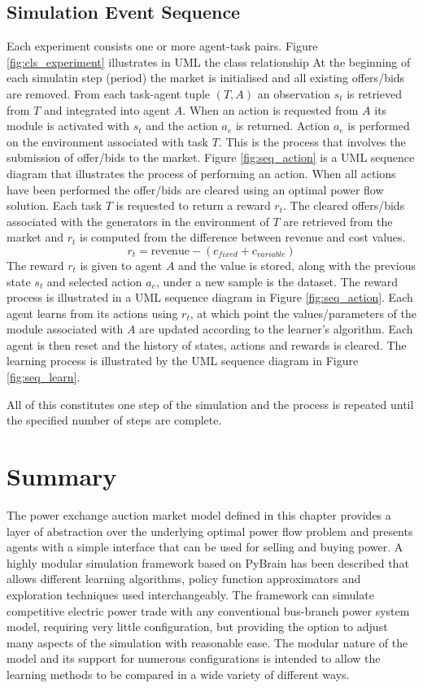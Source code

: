\subsection{Simulation Event Sequence}
%
Each experiment consists one or more agent-task pairs.  Figure
\ref{fig:cls_experiment} illustrates in UML the class relationship
%
At the beginning of each simulatin step (period) the market is initialised and
all existing offers/bids are removed.  From each task-agent tuple $(T,A)$ an
observation $s_t$ is retrieved from $T$ and integrated into agent $A$.  When
an action is requested from $A$ its module is activated with $s_t$ and the
action $a_e$ is returned.  Action $a_e$ is performed on the environment
associated with task $T$.  This is the process that involves the submission of
offer/bids to the market.  Figure \ref{fig:seq_action} is a UML sequence
diagram that illustrates the process of performing an action.
%
When all actions have been performed the offer/bids are cleared using an
optimal power flow solution.  Each task $T$ is requested to return a reward
$r_t$. The cleared offers/bids associated with the generators in the environment of $T$ are retrieved from the market and $r_t$ is computed from
the difference between revenue and cost values.
\begin{equation}
r_t = \mbox{revenue} - (c_{fixed} + c_{variable})
\end{equation}
The reward $r_t$ is given to agent $A$ and the value is stored, along with the
previous state $s_t$ and selected action $a_e$, under a new sample is the
dataset.  The reward process is illustrated in a UML sequence diagram in Figure
\ref{fig:seq_action}.
%
Each agent learns from its actions using $r_t$, at which point the
values/parameters of the module associated with $A$ are updated according to
the learner's algorithm.  Each agent is then reset and the history of states,
actions and rewards is cleared.  The learning process is illustrated by the UML
sequence diagram in  Figure \ref{fig:seq_learn}.

All of this constitutes one step of the simulation and the process is repeated
until the specified number of steps are complete.

\section{Summary}
The power exchange auction market model defined in this chapter provides a
layer of abstraction over the underlying optimal power flow problem and
presents agents with a simple interface that can be used for selling and buying
power.  A highly modular simulation framework based on PyBrain has been
described that allows different learning algorithms, policy function
approximators and exploration techniques used interchangeably.  The framework
can simulate competitive electric power trade with any conventional bus-branch
power system model, requiring very little configuration, but providing the
option to adjust many aspects of the simulation with reasonable ease.  The
modular nature of the model and its support for numerous configurations is
intended to allow the learning methods to be compared in a wide variety of
different ways.
